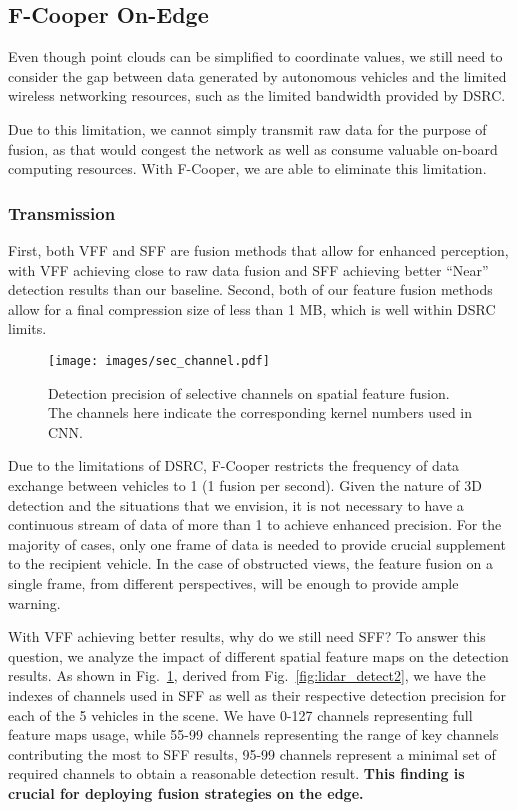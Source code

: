 \documentclass[sigconf]{acmart}
\begin{document}
\subsection{\textbf{F-Cooper On-Edge}}


Even though point clouds can be simplified to coordinate values, we still need to consider the gap between data generated by autonomous vehicles and the limited wireless networking resources, such as the limited bandwidth provided by DSRC.

Due to this limitation, we cannot simply  transmit raw data for the purpose of fusion, as that would congest the network as well as consume valuable on-board computing resources. With F-Cooper, we are able to eliminate this limitation. 

\subsubsection{Transmission}
First, both VFF and SFF are fusion methods that allow for enhanced perception, with VFF achieving close to raw data fusion and SFF achieving better ``Near'' detection results than our baseline. Second, both of our feature fusion methods allow for a final compression size of less than 1 MB, which is well within DSRC limits.

\begin{figure}[!h]
\centering
\texttt{[image: images/sec\_channel.pdf]}
\vspace{-11pt}
\caption{Detection precision of selective channels on spatial feature fusion. The channels here indicate the corresponding kernel numbers used in CNN.}
\vspace{-11pt}
\label{figure:channel}
\end{figure}


Due to the limitations of DSRC, F-Cooper restricts the frequency of data exchange between vehicles to 1 (1 fusion per second). Given the nature of 3D detection and the
situations that we envision, it is not necessary to have a continuous stream of data of
more than 1 to achieve enhanced precision. For the majority of cases, only one frame of data is needed to provide crucial supplement to the recipient vehicle. In the case of obstructed views, the feature fusion on a single frame, from different perspectives, will be enough to provide ample warning.





With VFF achieving better results, why do we still need SFF? To answer this question, we analyze the impact of different spatial feature maps on the detection results. As shown in Fig.~\ref{figure:channel}, derived from Fig.~\ref{fig:lidar_detect2}, we have the indexes of channels used in SFF as well as their respective detection precision for each of the 5 vehicles in the scene. 
We have 0-127 channels representing full feature maps usage, while 55-99 channels representing the range of key channels contributing the most to SFF results, 95-99 channels represent a minimal set of required channels to obtain a reasonable detection result.  
\textbf{This finding is crucial for deploying fusion strategies on the edge.} 
\end{document}
